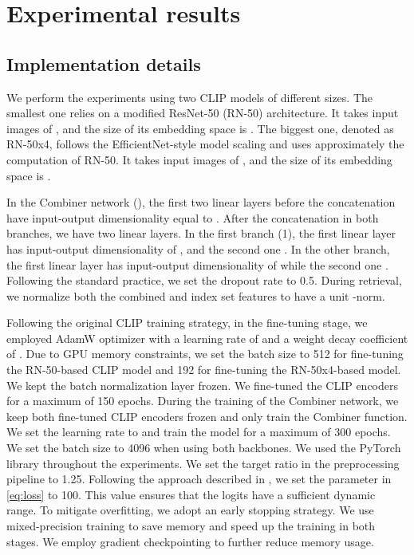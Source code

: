 \documentclass[acmlarge]{acmart}
\begin{document}
\section{Experimental results}\label{sec:experiments}
\subsection{Implementation details}
We perform the experiments using two CLIP models of different sizes. The smallest one relies on a modified ResNet-50 (RN-50) \cite{he2016deep} architecture. It takes input images of , and the size of its embedding space is . The biggest one, denoted as RN-50x4, follows the EfficientNet-style model scaling and uses approximately  the computation of RN-50. It takes input images of , and the size of its embedding space is .

In the Combiner network (), the first two linear layers before the concatenation have input-output dimensionality equal to .
After the concatenation in both branches, we have two linear layers. In the first branch (1), the first linear layer has input-output dimensionality of , and the second one .
In the other branch, the first linear layer has input-output dimensionality of  while the second one .
Following the standard practice, we set the dropout rate to 0.5.
During retrieval, we normalize both the combined and index set features to have a unit -norm.

Following the original CLIP training strategy, in the fine-tuning stage, we employed AdamW optimizer \cite{loshchilov2018decoupled} with a learning rate of  and a weight decay coefficient of . 
Due to GPU memory constraints, we set the batch size to 512 for fine-tuning the RN-50-based CLIP model and 192 for fine-tuning the RN-50x4-based model.
We kept the batch normalization layer frozen.
We fine-tuned the CLIP encoders for a maximum of 150 epochs.
During the training of the Combiner network, we keep both fine-tuned CLIP encoders frozen and only train the Combiner function. We set the learning rate to  and train the model for a maximum of 300 epochs. We set the batch size to 4096 when using both backbones.
We used the PyTorch library throughout the experiments. We set the target ratio in the preprocessing pipeline to 1.25. 
Following the approach described in \cite{radford2021learning}, we set the parameter  in \cref{eq:loss} to 100. This value ensures that the logits have a sufficient dynamic range.
To mitigate overfitting, we adopt an early stopping strategy. We use mixed-precision training \cite{micikevicius2018mixed} to save memory and speed up the training in both stages. We employ gradient checkpointing \cite{chen2016training} to further reduce memory usage.
\end{document}
